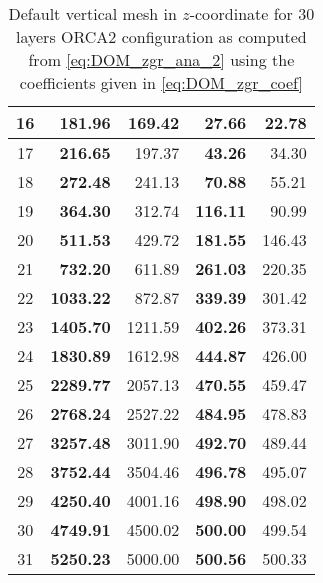 \documentclass[../main/NEMO_manual]{subfiles}
\begin{document}
\begin{table}
\begin{center}
\begin{tabular}{c||r|r|r|r}
      \hline
      16             & \textbf{   181.96} &             169.42 & \textbf{   27.66} &            22.78 \\
      \hline
      17             & \textbf{   216.65} &             197.37 & \textbf{   43.26} &            34.30 \\
      \hline
      18             & \textbf{   272.48} &             241.13 & \textbf{   70.88} &            55.21 \\
      \hline
      19             & \textbf{   364.30} &             312.74 & \textbf{  116.11} &            90.99 \\
      \hline
      20             & \textbf{   511.53} &             429.72 & \textbf{  181.55} &           146.43 \\
      \hline
      21             & \textbf{   732.20} &             611.89 & \textbf{  261.03} &           220.35 \\
      \hline
      22             & \textbf{  1033.22} &             872.87 & \textbf{  339.39} &           301.42 \\
      \hline
      23             & \textbf{  1405.70} &            1211.59 & \textbf{  402.26} &           373.31 \\
      \hline
      24             & \textbf{  1830.89} &            1612.98 & \textbf{  444.87} &           426.00 \\
      \hline
      25             & \textbf{  2289.77} &            2057.13 & \textbf{  470.55} &           459.47 \\
      \hline
      26             & \textbf{  2768.24} &            2527.22 & \textbf{  484.95} &           478.83 \\
      \hline
      27             & \textbf{  3257.48} &            3011.90 & \textbf{  492.70} &           489.44 \\
      \hline
      28             & \textbf{  3752.44} &            3504.46 & \textbf{  496.78} &           495.07 \\
      \hline
      29             & \textbf{  4250.40} &            4001.16 & \textbf{  498.90} &           498.02 \\
      \hline
      30             & \textbf{  4749.91} &            4500.02 & \textbf{  500.00} &           499.54 \\
      \hline
      31             & \textbf{  5250.23} &            5000.00 & \textbf{  500.56} &           500.33 \\
      \hline
    \end{tabular}
  \end{center}
  \caption{
    \protect\label{tab:orca_zgr}
    Default vertical mesh in $z$-coordinate for 30 layers ORCA2 configuration as computed from
    \autoref{eq:DOM_zgr_ana_2} using the coefficients given in \autoref{eq:DOM_zgr_coef}
  }
\end{table}
\end{document}
